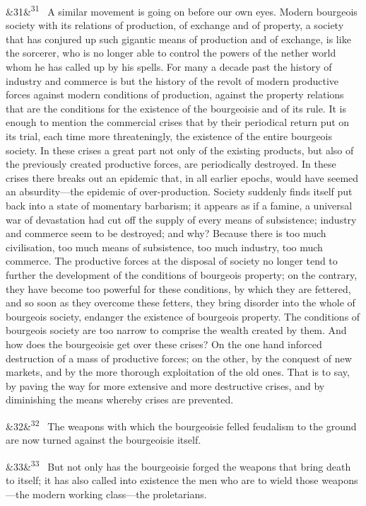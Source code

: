 \documentclass[12pt]{article}
\newcommand{\para}[1][]{\par\noindent\ifx&#1&\else\textsuperscript{\footnotesize #1}~\fi}
\begin{document}
\para[31] A similar movement is going on before our own eyes. Modern bourgeois society with its relations of production, of exchange and of property, a society that has conjured up such gigantic means of production and of exchange, is like the sorcerer, who is no longer able to control the powers of the nether world whom he has called up by his spells. For many a decade past the history of industry and commerce is but the history of the revolt of modern productive forces against modern conditions of production, against the property relations that are the conditions for the existence of the bourgeoisie and of its rule. It is enough to mention the commercial crises that by their periodical return put on its trial, each time more threateningly, the existence of the entire bourgeois society. In these crises a great part not only of the existing products, but also of the previously created productive forces, are periodically destroyed. In these crises there breaks out an epidemic that, in all earlier epochs, would have seemed an absurdity---the epidemic of over-production. Society suddenly finds itself put back into a state of momentary barbarism; it appears as if a famine, a universal war of devastation had cut off the supply of every means of subsistence; industry and commerce seem to be destroyed; and why? Because there is too much civilisation, too much means of subsistence, too much industry, too much commerce. The productive forces at the disposal of society no longer tend to further the development of the conditions of bourgeois property; on the contrary, they have become too powerful for these conditions, by which they are fettered, and so soon as they overcome these fetters, they bring disorder into the whole of bourgeois society, endanger the existence of bourgeois property. The conditions of bourgeois society are too narrow to comprise the wealth created by them. And how does the bourgeoisie get over these crises? On the one hand inforced destruction of a mass of productive forces; on the other, by the conquest of new markets, and by the more thorough exploitation of the old ones. That is to say, by paving the way for more extensive and more destructive crises, and by diminishing the means whereby crises are prevented.

\para[32] The weapons with which the bourgeoisie felled feudalism to the ground are now turned against the bourgeoisie itself.

\para[33] But not only has the bourgeoisie forged the weapons that bring death to itself; it has also called into existence the men who are to wield those weapons---the modern working class---the proletarians.
\end{document}
